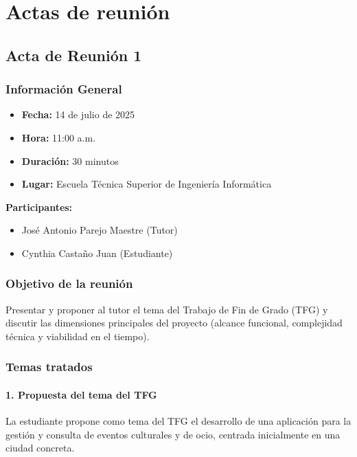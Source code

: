 \chapter{Actas de reunión}\label{anexo:actas}

\section*{Acta de Reunión 1}

\subsection*{Información General}
\begin{itemize}
    \item \textbf{Fecha:} 14 de julio de 2025
    \item \textbf{Hora:} 11:00 a.m.
    \item \textbf{Duración:} 30 minutos
    \item \textbf{Lugar:} Escuela Técnica Superior de Ingeniería Informática
\end{itemize}

\textbf{Participantes:}
\begin{itemize}
    \item José Antonio Parejo Maestre (Tutor)
    \item Cynthia Castaño Juan (Estudiante)
\end{itemize}

\subsection*{Objetivo de la reunión}
Presentar y proponer al tutor el tema del Trabajo de Fin de Grado (TFG) y discutir las dimensiones principales del proyecto (alcance funcional, complejidad técnica y viabilidad en el tiempo).

\subsection*{Temas tratados}

\subsubsection*{1. Propuesta del tema del TFG}
La estudiante propone como tema del TFG el desarrollo de una aplicación para la gestión y consulta de eventos culturales y de ocio, centrada inicialmente en una ciudad concreta.

